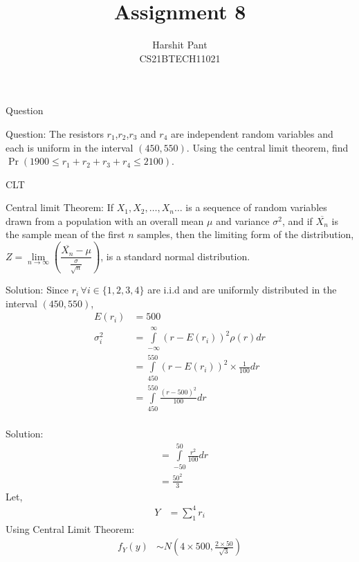 \documentclass{beamer}
\title{Assignment 8}
\author[CS21BTECH11021]{Harshit Pant\\CS21BTECH11021}
\date{}
\providecommand{\brak}[1]{\ensuremath{\left(#1\right)}}
\providecommand{\pr}[1]{\ensuremath{\Pr\left(#1\right)}}
\begin{document}
\begin{block}
\titlepage
\end{block}
\begin{frame}{Question}
\begin{block}{Question:}
The resistors $r_1$,$r_2$,$r_3$ and $r_4$ are independent random variables and each is uniform in the interval $(450,550)$. Using the central limit theorem, find $\pr{1900\leq r_1+r_2+r_3+r_4\leq 2100}$.
\end{block}
\end{frame}
\begin{frame}{CLT}
\begin{block}{Central limit Theorem:}
If $X_1,X_2,\ldots,X_n\ldots$ is a sequence of random variables drawn from a population with an overall mean $\mu$ and variance $\sigma^2$, and if $\overline{X_n}$ is the sample mean of the first $n$ samples, then the limiting form of the distribution, $Z=\displaystyle{\lim\limits_{n\to\infty}\brak{\dfrac{\overline{X_n}-\mu}{\frac{\sigma}{\sqrt{n}}}}}$, is a standard normal distribution.
\end{block}
\end{frame}
\begin{frame}{Solution:}
\begingroup
\addtolength{\jot}{.1in}
Since $r_i \,\forall i\in\{1,2,3,4\}$ are i.i.d and are uniformly distributed in the interval $(450,550)$,
\begin{align}
E(r_i)&=500\\
\sigma_i^2&=\int \limits_{-\infty}^\infty {(r-E(r_i))}^2\rho(r)dr\\
&=\int\limits_{450}^{550} {(r-E(r_i))}^2\times \frac1{100}dr\\
&=\int\limits_{450}^{550} \frac{{(r-500)}^2}{100}dr\\
\end{align}
\endgroup
\end{frame}
\begin{frame}{Solution:}
\begingroup
\addtolength{\jot}{.1in}
\begin{align}
&=\int\limits_{-50}^{50} \frac{r^2}{100}dr\\
&=\frac{50^2}{3}
\end{align}
Let,
\begin{align}
Y&=\sum_1^4 r_i
\end{align}
Using Central Limit Theorem:
\begin{align}
f_Y(y)&\sim N\brak{4\times500,\frac{2\times50}{\sqrt{3}}}
\end{align}
\endgroup
\end{frame}
\end{document}
